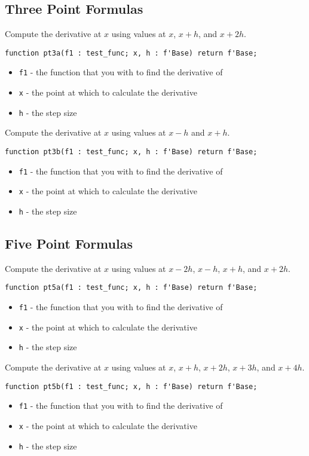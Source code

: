 \documentclass[10pt, openany]{book}
\newcommand{\function}[1]{\texttt{#1}}
\begin{document}
\subsection{Three Point Formulas}
Compute the derivative at $x$ using values at $x$, $x+h$, and $x+2h$.
\begin{lstlisting}
function pt3a(f1 : test_func; x, h : f'Base) return f'Base;
\end{lstlisting}
\begin{itemize}
  \item \function{f1} - the function that you with to find the derivative of
  \item \function{x} - the point at which to calculate the derivative
  \item \function{h} - the step size
\end{itemize}

Compute the derivative at $x$ using values at $x-h$ and $x+h$.
\begin{lstlisting}
function pt3b(f1 : test_func; x, h : f'Base) return f'Base;
\end{lstlisting}
\begin{itemize}
  \item \function{f1} - the function that you with to find the derivative of
  \item \function{x} - the point at which to calculate the derivative
  \item \function{h} - the step size
\end{itemize}

\subsection{Five Point Formulas}

Compute the derivative at $x$ using values at $x-2h$, $x-h$, $x+h$, and $x+2h$.
\begin{lstlisting}
function pt5a(f1 : test_func; x, h : f'Base) return f'Base;
\end{lstlisting}
\begin{itemize}
  \item \function{f1} - the function that you with to find the derivative of
  \item \function{x} - the point at which to calculate the derivative
  \item \function{h} - the step size
\end{itemize}

Compute the derivative at $x$ using values at $x$, $x+h$, $x+2h$, $x+3h$, and $x+4h$.
\begin{lstlisting}
function pt5b(f1 : test_func; x, h : f'Base) return f'Base;
\end{lstlisting}
\begin{itemize}
  \item \function{f1} - the function that you with to find the derivative of
  \item \function{x} - the point at which to calculate the derivative
  \item \function{h} - the step size
\end{itemize}
\end{document}
